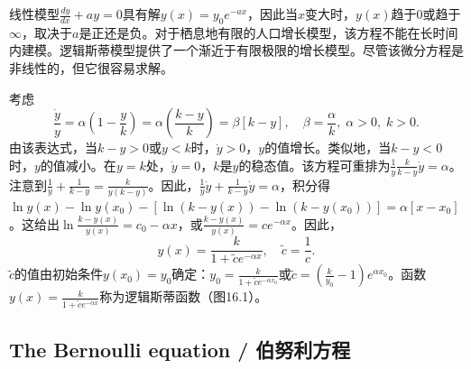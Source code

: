 \begin{translation}
线性模型$\frac{dy}{dx} + ay = 0$具有解$y(x) = y_0 e^{-ax}$，因此当$x$变大时，$y(x)$趋于$0$或趋于$\infty$，取决于$a$是正还是负。对于栖息地有限的人口增长模型，该方程不能在长时间内建模。逻辑斯蒂模型提供了一个渐近于有限极限的增长模型。尽管该微分方程是非线性的，但它很容易求解。

考虑
\[
\frac{\dot{y}}{y} = \alpha\left(1 - \frac{y}{k}\right) = \alpha\left(\frac{k - y}{k}\right) = \beta[k - y], \quad \beta = \frac{\alpha}{k}, \;\alpha > 0,\; k > 0.
\]
由该表达式，当$k - y > 0$或$y < k$时，$\dot{y} > 0$，$y$的值增长。类似地，当$k - y < 0$时，$y$的值减小。在$y = k$处，$\dot{y} = 0$，$k$是$y$的稳态值。该方程可重排为$\frac{1}{y}\frac{k}{k - y}\dot{y} = \alpha$。注意到$\frac{1}{y} + \frac{1}{k - y} = \frac{k}{y(k - y)}$。因此，$\frac{1}{y}\dot{y} + \frac{1}{k - y}\dot{y} = \alpha$，积分得$\ln y(x) - \ln y(x_0) - [\ln(k - y(x)) - \ln(k - y(x_0))] = \alpha[x - x_0]$。这给出$\ln\frac{k - y(x)}{y(x)} = c_0 - \alpha x$，或$\frac{k - y(x)}{y(x)} = c e^{-\alpha x}$。因此，
\[
y(x) = \frac{k}{1 + \tilde{c} e^{-\alpha x}}, \quad \tilde{c} = \frac{1}{c}.
\]
$\tilde{c}$的值由初始条件$y(x_0) = y_0$确定：$y_0 = \frac{k}{1 + \tilde{c} e^{-\alpha x_0}}$或$\tilde{c} = (\frac{k}{y_0} - 1) e^{\alpha x_0}$。函数$y(x) = \frac{k}{1 + \tilde{c} e^{-\alpha x}}$称为逻辑斯蒂函数（图16.1）。
\end{translation}
\subsection{The Bernoulli equation / 伯努利方程}

